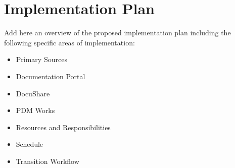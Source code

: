 \section{Implementation Plan}

Add here an overview of the proposed implementation plan including the following specific areas of implementation:

\begin{itemize}

\item Primary Sources
\item Documentation Portal
\item DocuShare
\item PDM Works
\item Resources and Responsibilities
\item Schedule
\item Transition Workflow

\end{itemize}
